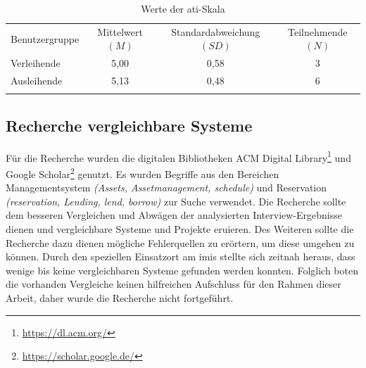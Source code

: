 \begin{table}[h]
        \centering
        \caption{Werte der \ac{ati}-Skala}
        \begin{tabular}{lccc}
                \arrayrulecolor{maincolor}\hline
                \sffamily\color{maincolor}Benutzergruppe & \sffamily\color{maincolor}Mittelwert
                $(M)$                                    & \sffamily\color{maincolor}Standardabweichung $(SD)$ &
                \sffamily\color{maincolor}Teilnehmende $(N)$                                                          \\
                \arrayrulecolor{maincolor}\hline
                Verleihende                              & 5,00                                                & 0,58
                                                         & 3                                                          \\
                Ausleihende                              & 5,13                                                & 0,48
                                                         & 6                                                          \\
                \arrayrulecolor{maincolor}\hline
        \end{tabular}
        \label{table:ati}
\end{table}

\subsection{Recherche vergleichbare Systeme}
\label{subsection:system}
Für die Recherche wurden die digitalen Bibliotheken ACM Digital
Library\footnote{\url{https://dl.acm.org/}} und Google
Scholar\footnote{\url{https://scholar.google.de/}} genutzt. Es wurden Begriffe aus den Bereichen
Managementsystem \textit{(Assets, Assetmanagement, schedule)} und Reservation \textit{(reservation,
Lending, lend, borrow)} zur Suche verwendet. Die Recherche sollte dem besseren Vergleichen und
Abwägen der analysierten Interview-Ergebnisse dienen und vergleichbare Systeme und Projekte
eruieren. Des Weiteren sollte die Recherche dazu dienen mögliche Fehlerquellen zu erörtern, um diese
umgehen zu können. Durch den speziellen Einsatzort am \ac{imis} stellte sich zeitnah heraus, dass
wenige bis keine vergleichbaren Systeme gefunden werden konnten. Folglich boten die vorhanden
Vergleiche keinen hilfreichen Aufschluss für den Rahmen dieser Arbeit, daher wurde die Recherche
nicht fortgeführt.

